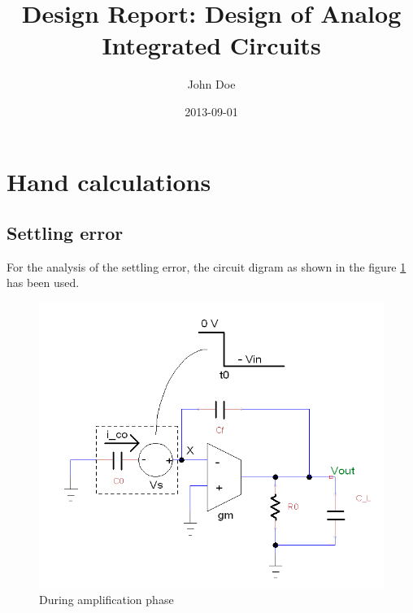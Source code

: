 \documentclass{article}
\title{Design Report: Design of Analog Integrated Circuits}
\date{2013-09-01}
\author{John Doe}
\begin{document}
  \maketitle
  \newpage
\section{Hand calculations}
\subsection{Settling error}
For the analysis of the settling error, the circuit digram as shown in the figure \ref{fig:amp_phase} has been used. 

\begin{figure}[h!]
  \includegraphics[width=\linewidth]{amplification_phase.png}
  \caption{During amplification phase}
  \label{fig:amp_phase}
\end{figure}
\end{document}
